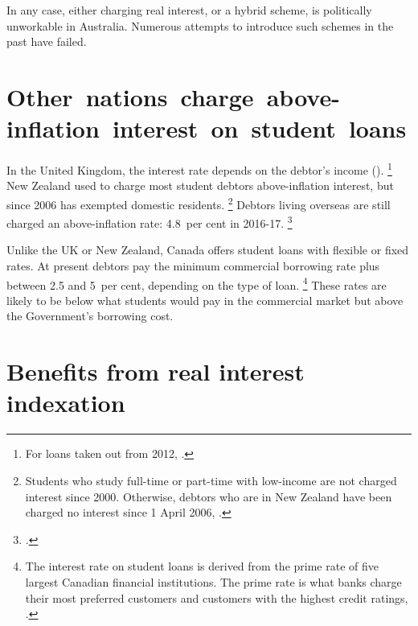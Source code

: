 \documentclass{grattan}
\begin{document}
In any case, either charging real interest, or a hybrid scheme, is politically unworkable in Australia. Numerous attempts to introduce such schemes in the past have failed.

\section{\mbox{Other nations charge above-inflation interest on student~loans}}\label{other-countries-charge-above-inflation-interest-on-student-loans}

In the United Kingdom, the interest rate depends on the debtor's income ().%
   \footnote{For loans taken out from 2012, \textcite{Company2015Changesinterestrates}.}
New Zealand used to charge most student debtors above-inflation interest, but since 2006 has exempted domestic residents.%
   \footnote{Students who study full-time or part-time with low-income are not charged interest since 2000.
Otherwise, debtors who are in New Zealand have been charged no interest since 1 April 2006, \textcite[][50]{EducationNZ2015Studentloanscheme}.} 
Debtors living overseas are still charged an above-inflation rate: 4.8~per cent in 2016-17.%
\footcite{InlandRevenue2016Interestothercharges}

Unlike the UK or New Zealand, Canada offers student loans with flexible or fixed rates.
At present debtors pay the minimum commercial borrowing rate plus between 2.5 and 5~per cent, depending on the type of loan.%
   \footnote{The interest rate on student loans is derived from the prime rate of five largest Canadian financial institutions. The prime rate is what banks charge their most preferred customers and customers with the highest credit ratings, \textcites{Canada2016InterestratesCanada}{Canada2016LoanRepaymentEstimator}.} 
These rates are likely to be below what students would pay in the commercial market but above the Government's borrowing cost.

\section{Benefits from real interest indexation}\label{benefits-from-real-interest-indexation}
\end{document}
